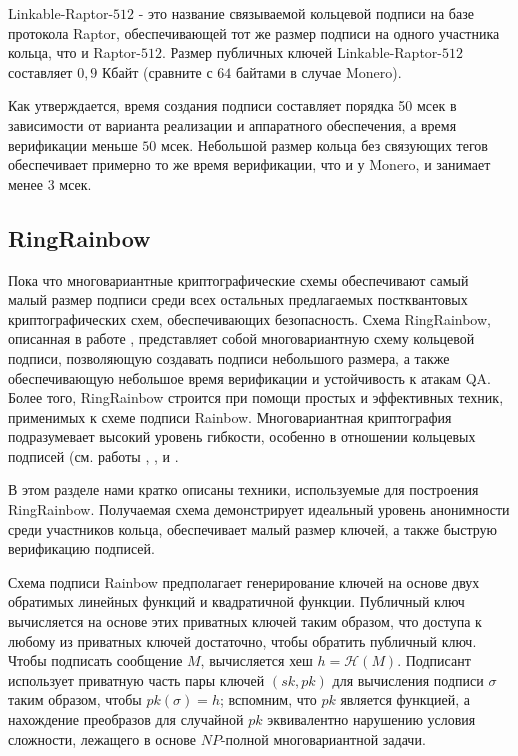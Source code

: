 \documentclass{mrl}
\begin{document}
Linkable-Raptor-$512$ - это название связываемой кольцевой подписи на базе протокола Raptor, обеспечивающей тот же размер подписи на одного участника кольца, что и Raptor-$512$. Размер публичных ключей Linkable-Raptor-$512$ составляет $0,9$ Кбайт (сравните с $64$ байтами в случае Monero).

Как утверждается, время создания подписи составляет порядка 50 мсек в зависимости от варианта реализации и аппаратного обеспечения, а время верификации меньше $50$ мсек. Небольшой размер кольца без связующих тегов обеспечивает примерно то же время верификации, что и у Monero, и занимает менее $3$ мсек.

\subsection{RingRainbow}

Пока что многовариантные криптографические схемы обеспечивают самый малый размер подписи среди всех остальных предлагаемых постквантовых криптографических схем, обеспечивающих безопасность. Схема RingRainbow, описанная в работе \cite{mohamed2017ringrainbow}, представляет собой многовариантную схему кольцевой подписи, позволяющую создавать подписи небольшого размера, а также обеспечивающую небольшое время верификации и устойчивость к атакам QA. Более того, RingRainbow строится при помощи простых и эффективных техник, применимых к схеме подписи Rainbow. Многовариантная криптография подразумевает высокий уровень гибкости, особенно в отношении кольцевых подписей (см. работы \cite{petzoldt2020efficient}, \cite{petzoldt2013multivariate}, \cite{demircioglu2020efficient} и \cite{mohamed2017efficient}.

В этом разделе нами кратко описаны техники, используемые для построения RingRainbow. Получаемая схема демонстрирует идеальный уровень анонимности среди участников кольца, обеспечивает малый размер ключей, а также быструю верификацию подписей.

Схема подписи Rainbow предполагает генерирование ключей на основе двух обратимых линейных функций и квадратичной функции. Публичный ключ вычисляется на основе этих приватных ключей таким образом, что доступа к любому из приватных ключей достаточно, чтобы обратить публичный ключ. Чтобы подписать сообщение $M$, вычисляется хеш $h = \mathcal{H}(M)$. Подписант использует приватную часть пары ключей $(sk, pk)$ для вычисления подписи $\sigma$ таким образом, чтобы $pk(\sigma) = h$; вспомним, что $pk$ является функцией, а нахождение преобразов для случайной $pk$ эквивалентно нарушению условия сложности, лежащего в основе $NP$-полной многовариантной задачи.
\end{document}

